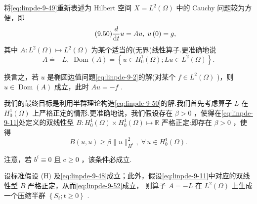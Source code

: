 将\eqref{eq:linpde-9-49}重新表述为 Hilbert 空间 $X = {L}^{2}\left( \Omega \right)$ 中的 Cauchy 问题较为方便，即
\begin{equation}\tag{9.50}\label{eq:linpde-9-50}
\frac{d}{\mathop{}\!\mathrm{d} t}u = {Au},\;u\left( 0\right)  = g,
\end{equation}
其中 $A : {L}^{2}\left( \Omega \right)  \mapsto  {L}^{2}\left( \Omega \right)$ 为某个适当的(无界)线性算子.更准确地说
\begin{equation}\tag{9.51}\label{eq:linpde-9-51}
A \doteq   - L,\;\operatorname{Dom}\left( A\right)  = \left\{  {u \in  {H}_{0}^{1}\left( \Omega \right) ;{Lu} \in  {L}^{2}\left( \Omega \right) }\right\}  .
\end{equation}

换言之，若 $u$ 是椭圆边值问题\eqref{eq:linpde-9-2}的解(对某个 $f \in  {L}^{2}\left( \Omega \right)$ )，则 $u \in  \operatorname{Dom}\left( A\right)$ 成立，此时 ${Au} =  - f$ .

我们的最终目标是利用半群理论构造\eqref{eq:linpde-9-50}的解.我们首先考虑算子 $L$ 在 ${H}_{0}^{1}\left( \Omega \right)$ 上严格正定的情形.更准确地说，我们假设存在 $\beta  > 0$ ，使得在\eqref{eq:linpde-9-11}处定义的双线性型 $B : {H}_{0}^{1}\left( \Omega \right)  \times  {H}_{0}^{1}\left( \Omega \right)  \mapsto  \mathbb{R}$ 严格正定:即存在 $\beta  > 0$ ，使得
\begin{equation}\tag{9.52}\label{eq:linpde-9-52}
B\left(  {u,u}\right)   \geq  \beta \| u{\| }_{{H}^{1}}^{2},\;\forall\,u \in  {H}_{0}^{1}\left( \Omega \right) .
\end{equation}

注意，若 ${b}^{i} \equiv  0$ 且 $\mathrm{c} \geq  0$ ，该条件必成立.

\begin{theorem}\label{thm:linpde-9-18}
设标准假设 (H) 及\eqref{eq:linpde-9-48}成立；此外，假设\eqref{eq:linpde-9-11}中对应的双线性型 $B$ 严格正定，从而\eqref{eq:linpde-9-52}成立，
则算子 $A =  - L$ 在 ${L}^{2}\left( \Omega \right)$ 上生成一个压缩半群 $\left\{  {{S}_{t};t \geq  0}\right\}$ .
\end{theorem}

